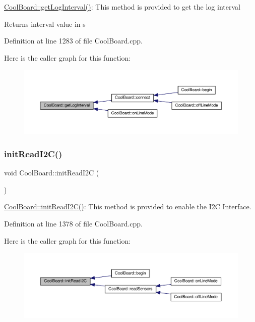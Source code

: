 \hyperlink{class_cool_board_a7508e029f2ee17bb747ffab599285e0d}{Cool\+Board\+::get\+Log\+Interval()}\+: This method is provided to get the log interval

\begin{DoxyReturn}{Returns}
interval value in s 
\end{DoxyReturn}


Definition at line 1283 of file Cool\+Board.\+cpp.

Here is the caller graph for this function\+:
\nopagebreak
\begin{figure}[H]
\begin{center}
\leavevmode
\includegraphics[width=350pt]{class_cool_board_a7508e029f2ee17bb747ffab599285e0d_icgraph}
\end{center}
\end{figure}
\mbox{\label{class_cool_board_a397b46fadab8f530a8cf4d914c561366}} 
\subsubsection{\texorpdfstring{init\+Read\+I2\+C()}{initReadI2C()}}
{\footnotesize\ttfamily void Cool\+Board\+::init\+Read\+I2C (\begin{DoxyParamCaption}{ }\end{DoxyParamCaption})}

\hyperlink{class_cool_board_a397b46fadab8f530a8cf4d914c561366}{Cool\+Board\+::init\+Read\+I2\+C()}\+: This method is provided to enable the I2C Interface. 

Definition at line 1378 of file Cool\+Board.\+cpp.

Here is the caller graph for this function\+:
\nopagebreak
\begin{figure}[H]
\begin{center}
\leavevmode
\includegraphics[width=350pt]{class_cool_board_a397b46fadab8f530a8cf4d914c561366_icgraph}
\end{center}
\end{figure}
\mbox{\label{class_cool_board_ad7442cf4b62c7b0d5bd62a0f75ffc065}} 
